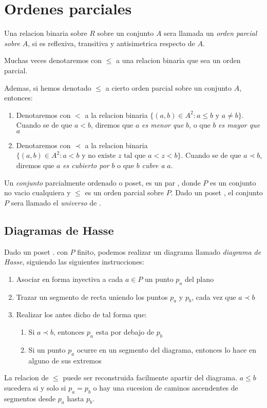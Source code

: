 

\section{Ordenes parciales}
\begin{definition}
  Una relacion binaria sobre $R$ sobre un conjunto $A$ sera llamada un \emph{orden parcial sobre} $A$,
  si es reflexiva, transitiva y antisimetrica respecto de $A$.
  
  Muchas veces denotaremos con $\leq$ a una relacion binaria que sea un orden parcial.

  Ademas, si hemos denotado $\leq$ a cierto orden parcial sobre un conjunto $A$, entonces:
  \begin{enumerate}
    \item Denotaremos con $<$ a la relacion binaria $\{(a, b) \in A^2 : a \leq b \text{ y } a \neq b\}$. Cuando se
    de que $a < b$, diremos que $a$ \emph{es menor que} $b$, o que $b$ \emph{es mayor que} $a$
    \item Denotaremos con $\prec$ a la relacion binaria $\{(a, b) \in A^2 : a < b \text{ y no existe $z$ tal que $a < z < b$}\}$.
    Cuando se de que $a \prec b$, diremos que $a$ \emph{es cubierto por} $b$ o que $b$ \emph{cubre a} $a$.
  \end{enumerate}
\end{definition}

\begin{definition}
  Un \emph{conjunto} parcialmente ordenado o poset, es un par \poset, donde $P$ es un conjunto no vacio
  cualquiera y $\leq$ es un orden parcial sobre $P$. Dado un poset \poset, el conjunto $P$ sera llamado el \emph{universo} de \poset.
\end{definition}

\subsection{Diagramas de Hasse}
Dado un poset \poset. con $P$ finito, podemos realizar un diagrama llamado \emph{diagrama de Hasse}, siguiendo las siguientes instrucciones:
\begin{enumerate}
  \item Asociar en forma inyectiva a cada $a \in P$ un punto $p_a$ del plano
  \item Trazar un segmento de recta uniendo los puntos $p_a$ y $p_b$, cada vez que $a \prec b$
  \item Realizar los antes dicho de tal forma que: \begin{enumerate}
    \item Si $a \prec b$, entonces $p_a$ esta por debajo de $p_b$
    \item Si un punto $p_a$ ocurre en un segmento del diagrama, entonces lo hace en alguno de sus extremos 
  \end{enumerate}
\end{enumerate}
La relacion de $\leq$ puede ser reconstruida facilmente apartir del diagrama. $a \leq b$ sucedera si y solo si
$p_a = p_b$ o hay una sucesion de caminos ascendentes de segmentos desde $p_a$ hasta $p_b$.

